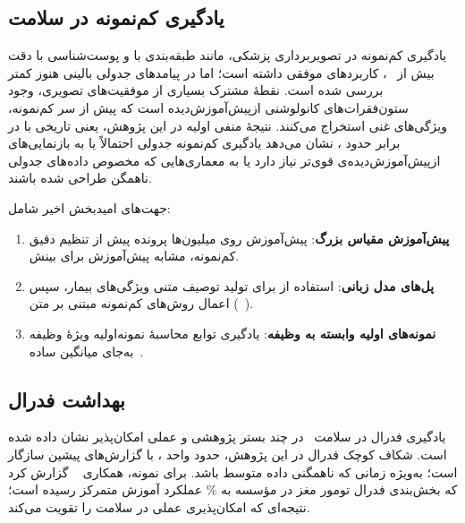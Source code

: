 \subsection{یادگیری کم‌نمونه در سلامت}

یادگیری کم‌نمونه در تصویربرداری پزشکی، مانند طبقه‌بندی  با \mbox{} و پوست‌شناسی با دقت بیش از \mbox{}~\cite{prabhu2019few}، کاربردهای موفقی داشته است؛ اما در پیامدهای جدولی بالینی هنوز کمتر بررسی شده است. نقطۀ مشترک بسیاری از موفقیت‌های تصویری، وجود ستون‌فقرات‌های کانولوشنی ازپیش‌آموزش‌دیده است که پیش از سر کم‌نمونه، ویژگی‌های غنی استخراج می‌کنند. نتیجۀ منفی اولیه در این پژوهش، یعنی  تاریخی با  در برابر  حدود ، نشان می‌دهد یادگیری کم‌نمونه جدولی احتمالاً یا به بازنمایی‌های ازپیش‌آموزش‌دیده‌ی قوی‌تر نیاز دارد یا به معماری‌هایی که مخصوص داده‌های جدولی ناهمگن طراحی شده باشند.

جهت‌های امیدبخش اخیر شامل:
\begin{enumerate}
\item \textbf{پیش‌آموزش  مقیاس بزرگ}: پیش‌آموزش روی میلیون‌ها پرونده پیش از تنظیم دقیق کم‌نمونه، مشابه پیش‌آموزش  برای بینش.
\item \textbf{پل‌های مدل زبانی}: استفاده از  برای تولید توصیف متنی ویژگی‌های بیمار، سپس اعمال روش‌های کم‌نمونه مبتنی بر متن (~\cite{hegselmann2023tabllm}).
\item \textbf{نمونه‌های اولیه وابسته به وظیفه}: یادگیری توابع محاسبۀ نمونه‌اولیه ویژۀ وظیفه به‌جای میانگین ساده~\cite{ye2020few}.
\end{enumerate}

\subsection{بهداشت فدرال}

یادگیری فدرال در سلامت~\cite{rieke2020future,duan2020federated} در چند بستر پژوهشی و عملی امکان‌پذیر نشان داده شده است. شکاف کوچک فدرال در این پژوهش، حدود  واحد ، با گزارش‌های پیشین سازگار است؛ به‌ویژه زمانی که ناهمگنی داده متوسط باشد. برای نمونه، همکاری ~\cite{sheller2020federated} گزارش کرد که بخش‌بندی فدرال تومور مغز در  مؤسسه به \% عملکرد آموزش متمرکز رسیده است؛ نتیجه‌ای که امکان‌پذیری عملی  در سلامت را تقویت می‌کند.

